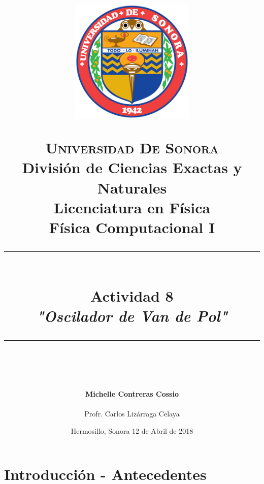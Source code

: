 \documentclass[12pt]{article}
\newcommand{\HRule}[1]{\rule{\linewidth}{#1}}
\begin{document}
\begin{titlepage}

\title{ \normalsize 
        \begin{center}
        \includegraphics[height=6cm]{logo.png}
        \end{center}
        \LARGE \textsc{\textbf{Universidad De Sonora}} \\ \bigskip
		\Large División de Ciencias Exactas y Naturales \\
        Licenciatura en Física \\ \bigskip
        \bigskip
        Física Computacional I
		\\ [0.1cm]  
		\HRule{2pt} \\
		\Large \textbf{{Actividad 8}} \\
        \textit{\textbf{"Oscilador de Van de Pol"}}
		\HRule{2pt} \\
		\normalsize \vspace*{0.001\baselineskip}}
        
\date{\bigskip \Large Hermosillo, Sonora  \hspace*{\fill}  12 de Abril de 2018}

        
\author{
		\Large\textbf{ Michelle Contreras Cossio} \\ \bigskip
        \\ \bigskip
       \Large Profr. Carlos Lizárraga Celaya}
       \end{titlepage}
       \maketitle
       

\newpage
\pagestyle{plain}

\section{Introducción - Antecedentes}
\end{document}
